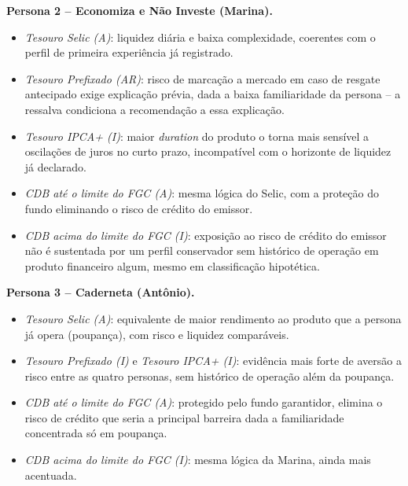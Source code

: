 \textbf{Persona 2 -- Economiza e N\~ao Investe (Marina).}
\begin{itemize}
  \item \textit{Tesouro Selic (A)}: liquidez di\'aria e baixa
    complexidade, coerentes com o perfil de primeira experi\^encia j\'a
    registrado.
  \item \textit{Tesouro Prefixado (AR)}: risco de marca\c{c}\~ao a
    mercado em caso de resgate antecipado exige explica\c{c}\~ao
    pr\'evia, dada a baixa familiaridade da persona -- a ressalva
    condiciona a recomenda\c{c}\~ao a essa explica\c{c}\~ao.
  \item \textit{Tesouro IPCA+ (I)}: maior \textit{duration} do produto
    o torna mais sens\'ivel a oscila\c{c}\~oes de juros no curto prazo,
    incompat\'ivel com o horizonte de liquidez j\'a declarado.
  \item \textit{CDB at\'e o limite do FGC (A)}: mesma l\'ogica do
    Selic, com a prote\c{c}\~ao do fundo eliminando o risco de
    cr\'edito do emissor.
  \item \textit{CDB acima do limite do FGC (I)}: exposi\c{c}\~ao ao
    risco de cr\'edito do emissor n\~ao \'e sustentada por um perfil
    conservador sem hist\'orico de opera\c{c}\~ao em produto financeiro
    algum, mesmo em classifica\c{c}\~ao hipot\'etica.
\end{itemize}

\textbf{Persona 3 -- Caderneta (Ant\^onio).}
\begin{itemize}
  \item \textit{Tesouro Selic (A)}: equivalente de maior rendimento ao
    produto que a persona j\'a opera (poupan\c{c}a), com risco e
    liquidez compar\'aveis.
  \item \textit{Tesouro Prefixado (I)} e \textit{Tesouro IPCA+ (I)}:
    evid\^encia mais forte de avers\~ao a risco entre as quatro
    personas, sem hist\'orico de opera\c{c}\~ao al\'em da poupan\c{c}a.
  \item \textit{CDB at\'e o limite do FGC (A)}: protegido pelo fundo
    garantidor, elimina o risco de cr\'edito que seria a principal
    barreira dada a familiaridade concentrada s\'o em poupan\c{c}a.
  \item \textit{CDB acima do limite do FGC (I)}: mesma l\'ogica da
    Marina, ainda mais acentuada.
\end{itemize}

